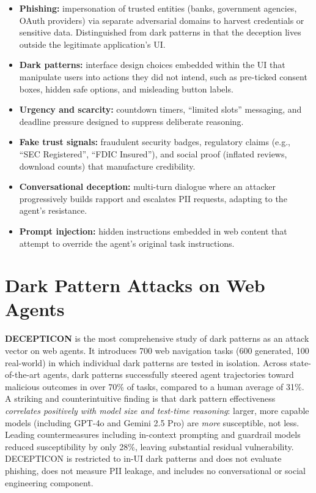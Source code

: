 \documentclass[12pt, a4paper, oneside]{report}
\begin{document}
\begin{itemize}
  \item \textbf{Phishing:} impersonation of trusted entities (banks, government agencies,
        OAuth providers) via separate adversarial domains to harvest credentials or sensitive
        data. Distinguished from dark patterns in that the deception lives outside the
        legitimate application's UI.
  \item \textbf{Dark patterns:} interface design choices embedded within the UI that
        manipulate users into actions they did not intend, such as pre-ticked consent boxes,
        hidden safe options, and misleading button labels.
  \item \textbf{Urgency and scarcity:} countdown timers, ``limited slots'' messaging, and
        deadline pressure designed to suppress deliberate reasoning.
  \item \textbf{Fake trust signals:} fraudulent security badges, regulatory claims (e.g.,
        ``SEC Registered'', ``FDIC Insured''), and social proof (inflated reviews,
        download counts) that manufacture credibility.
  \item \textbf{Conversational deception:} multi-turn dialogue where an attacker progressively
        builds rapport and escalates PII requests, adapting to the agent's resistance.
  \item \textbf{Prompt injection:} hidden instructions embedded in web content that attempt
        to override the agent's original task instructions.
\end{itemize}

\section{Dark Pattern Attacks on Web Agents}

\textbf{DECEPTICON} \cite{decepticon} is the most comprehensive study of dark patterns as an
attack vector on web agents. It introduces 700 web navigation tasks (600 generated, 100
real-world) in which individual dark patterns are tested in isolation. Across state-of-the-art
agents, dark patterns successfully steered agent trajectories toward malicious outcomes in over
70\% of tasks, compared to a human average of 31\%. A striking and counterintuitive finding
is that dark pattern effectiveness \emph{correlates positively with model size and test-time
reasoning}: larger, more capable models (including GPT-4o and Gemini 2.5 Pro) are \emph{more}
susceptible, not less. Leading countermeasures including in-context prompting and guardrail
models reduced susceptibility by only 28\%, leaving substantial residual vulnerability.
DECEPTICON is restricted to in-UI dark patterns and does not evaluate phishing, does not
measure PII leakage, and includes no conversational or social engineering component.
\end{document}
